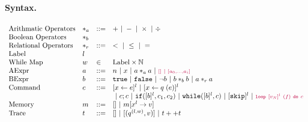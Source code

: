 \documentclass[a4paper,11pt]{article}
\begin{document}
\paragraph{Syntax.}
\[
\begin{array}{llll}
 \mbox{Arithmatic Operators} & *_a & ::= & + ~|~ - ~|~ \times 
%
~|~ \div \\  
  \mbox{Boolean Operators} & *_b & & \\
   \mbox{Relational Operators} & *_r & ::= & < ~|~ \leq ~|~ = \\  
 \mbox{Label} & l & & \\ 
 \mbox{While Map} & w & \in & \mbox{Label} \times \mathbb{N} \\
\mbox{AExpr} & \aexpr & ::= & 
  n ~|~ x ~|~ \aexpr *_a \aexpr ~|~ \jl{[] ~|~ [\aexpr_0, \dots, \aexpr_i] }\\
\mbox{BExpr} & \bexpr & ::= & 
  \etrue ~|~ \efalse  ~|~ \neg \bexpr
   ~|~ \bexpr *_b \bexpr
  ~|~ \aexpr *_r \aexpr \\
\mbox{Command} & c & ::= &   [\assign x \expr]^{l} ~|~  [\assign x q(\expr)]^{l}
%
 \\
& & & ~|~  c ; c ~|~ \eif([\bexpr]^{l}, c_1, c_2) 
  ~|~ \ewhile([\bexpr]^{l}, c) ~|~ [\eskip]^{l} \sep \jl{\eloop ~ [\valr_N]^{l} ~ (f) ~ \edo ~ c }
  \\
\mbox{Memory} & m & ::= & [] ~|~ m[x^{l} \to v] \\
%
\mbox{Trace} & t & ::= & [] ~|~ [(q ^{(l, w) }, v)] ~|~ t ++ t
\end{array}
\]
%
%
\end{document}
